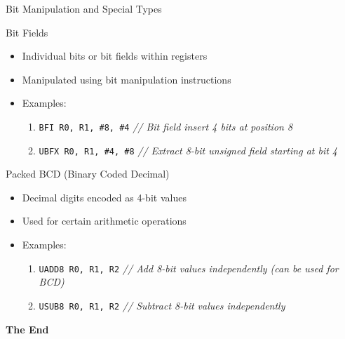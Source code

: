 \documentclass[aspectratio=169]{beamer}
\begin{document}
\begin{frame}{Bit Manipulation and Special Types}
    \begin{block}{Bit Fields}
    \begin{itemize}
    \item Individual bits or bit fields within registers
    \item Manipulated using bit manipulation instructions
    \item Examples:
    \begin{enumerate}
    \item \texttt{BFI R0, R1, \#8, \#4} \hfill \textit{// Bit field insert 4 bits at position 8}
    \item \texttt{UBFX R0, R1, \#4, \#8} \hfill \textit{// Extract 8-bit unsigned field starting at bit 4}
    \end{enumerate}
    \end{itemize}
    \end{block}
    \begin{block}{Packed BCD (Binary Coded Decimal)}
    \begin{itemize}
    \item Decimal digits encoded as 4-bit values
    \item Used for certain arithmetic operations
    \item Examples:
    \begin{enumerate}
    \item \texttt{UADD8 R0, R1, R2} \hfill \textit{// Add 8-bit values independently (can be used for BCD)}
    \item \texttt{USUB8 R0, R1, R2} \hfill \textit{// Subtract 8-bit values independently}
    \end{enumerate}
    \end{itemize}
    \end{block}
\end{frame}

\begin{frame}
    \Huge{\centerline{\color{androidGreen}\textbf{The End}}}
\end{frame}
\end{document}
